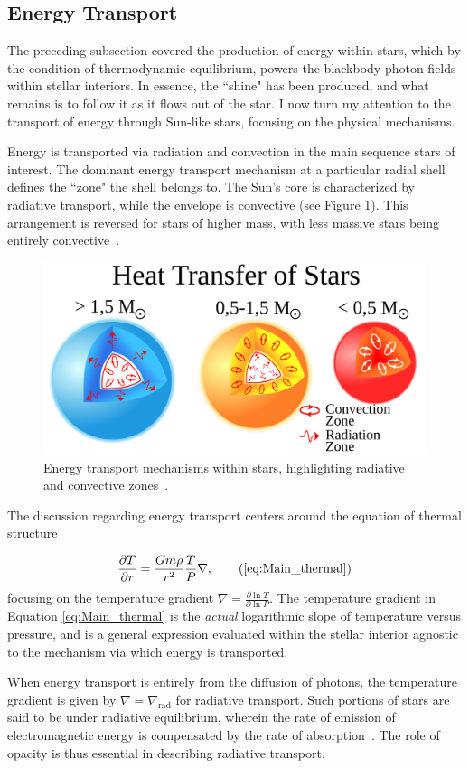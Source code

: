 \documentclass[12pt]{article}
\newcommand{\pderiv}[2]{\frac{\partial #1}{\partial #2}}
\begin{document}
\subsection{Energy Transport}
The preceding subsection covered the production of energy within stars, which by the condition of thermodynamic equilibrium, powers the blackbody photon fields within stellar interiors. In essence, the ``shine" has been produced, and what remains is to follow it as it flows out of the star. I now turn my attention to the transport of energy through Sun-like stars, focusing on the physical mechanisms.

Energy is transported via radiation and convection in the main sequence stars of interest. The dominant energy transport mechanism at a particular radial shell defines the ``zone" the shell belongs to. The Sun's core is characterized by radiative transport, while the envelope is convective (see Figure \ref{fig:transportImage}). This arrangement is reversed for stars of higher mass, with less massive stars being entirely convective~\cite{KWW_book}. 

\begin{figure}[H]
    \centering
    \includegraphics[width=0.5\linewidth]{Main Graphics/Heat_transfer.png}
    \caption{Energy transport mechanisms within stars, highlighting radiative and convective zones~\cite{transportImage}.}
    \label{fig:transportImage}
\end{figure}

The discussion regarding energy transport centers around the equation of thermal structure

\begin{equation}
    \pderiv{T}{r} = \frac{Gm\rho}{r^2}\frac{T}{P} \nabla,\tag{\ref{eq:Main_thermal}}
\end{equation}
%
focusing on the temperature gradient $\nabla = \pderiv{\ln T}{\ln P}$. The temperature gradient in Equation \ref{eq:Main_thermal} is the \textit{actual} logarithmic slope of temperature versus pressure, and is a general expression evaluated within the stellar interior agnostic to the mechanism via which energy is transported. 

When energy transport is entirely from the diffusion of photons, the temperature gradient is given by $\nabla = \nabla_\mathrm{rad}$ for radiative transport. Such portions of stars are said to be under radiative equilibrium, wherein the rate of emission of electromagnetic energy is compensated by the rate of absorption~\cite{Cox_Giuli_vol1}. The role of opacity is thus essential in describing radiative transport. 
\end{document}
